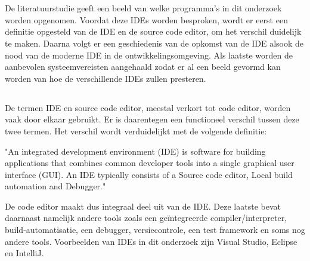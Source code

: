 \chapter{}
\label{ch:stand-van-zaken}



De literatuurstudie geeft een beeld van welke programma's in dit onderzoek worden opgenomen. Voordat deze IDEs worden besproken, wordt er eerst een definitie opgesteld van de IDE en de source code editor, om het verschil duidelijk te maken. Daarna volgt er een geschiedenis van de opkomst van de IDE alsook de nood van de moderne IDE in de ontwikkelingsomgeving. Als laatste worden de aanbevolen systeemvereisten aangehaald zodat er al een beeld gevormd kan worden van hoe de verschillende IDEs zullen presteren.

\section{}
\label{sec:IDE-codeEditor}

De termen IDE en source code editor, meestal verkort tot code editor, worden vaak door elkaar gebruikt. Er is daarentegen een functioneel verschil tussen deze twee termen. Het verschil wordt verduidelijkt met de volgende definitie:

\begin{displayquote}
"An integrated development environment (IDE) is software for building applications that combines common developer tools into a single graphical user interface (GUI). An IDE typically consists of a Source code editor,  Local build automation and Debugger." \autocite{RedHat2018}
\end{displayquote}

De code editor maakt dus integraal deel uit van de IDE. Deze laatste bevat daarnaast namelijk andere tools zoals een geïntegreerde compiler/interpreter, build-automatisatie, een debugger, versiecontrole, een test framework en soms nog andere tools. Voorbeelden van IDEs in dit onderzoek zijn Visual Studio, Eclipse en IntelliJ.

